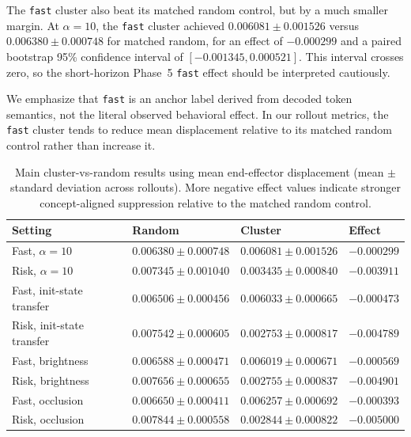 \documentclass[11pt]{article}
\begin{document}
The \texttt{fast} cluster also beat its matched random control, but by a much smaller margin. At $\alpha=10$, the \texttt{fast} cluster achieved $0.006081 \pm 0.001526$ versus $0.006380 \pm 0.000748$ for matched random, for an effect of $-0.000299$ and a paired bootstrap 95\% confidence interval of $[-0.001345,0.000521]$. This interval crosses zero, so the short-horizon Phase~5 \texttt{fast} effect should be interpreted cautiously.

We emphasize that \texttt{fast} is an anchor label derived from decoded token semantics, not the literal observed behavioral effect. In our rollout metrics, the \texttt{fast} cluster tends to reduce mean displacement relative to its matched random control rather than increase it.

\begin{table}[t]
  \centering
  \scriptsize
  \setlength{\tabcolsep}{3pt}
  \begin{tabular}{p{}p{}p{}p{}}
    \toprule
    Setting & Random & Cluster & Effect \\
    \midrule
    Fast, $\alpha=10$ & $0.006380 \pm 0.000748$ & $0.006081 \pm 0.001526$ & $-0.000299$ \\
    Risk, $\alpha=10$ & $0.007345 \pm 0.001040$ & $0.003435 \pm 0.000840$ & $-0.003911$ \\
    Fast, init-state transfer & $0.006506 \pm 0.000456$ & $0.006033 \pm 0.000665$ & $-0.000473$ \\
    Risk, init-state transfer & $0.007542 \pm 0.000605$ & $0.002753 \pm 0.000817$ & $-0.004789$ \\
    Fast, brightness & $0.006588 \pm 0.000471$ & $0.006019 \pm 0.000671$ & $-0.000569$ \\
    Risk, brightness & $0.007656 \pm 0.000655$ & $0.002755 \pm 0.000837$ & $-0.004901$ \\
    Fast, occlusion & $0.006650 \pm 0.000411$ & $0.006257 \pm 0.000692$ & $-0.000393$ \\
    Risk, occlusion & $0.007844 \pm 0.000558$ & $0.002844 \pm 0.000822$ & $-0.005000$ \\
    \bottomrule
  \end{tabular}
  \caption{Main cluster-vs-random results using mean end-effector displacement (mean $\pm$ standard deviation across rollouts). More negative effect values indicate stronger concept-aligned suppression relative to the matched random control.}
  \label{tab:main-results}
\end{table}
\end{document}
